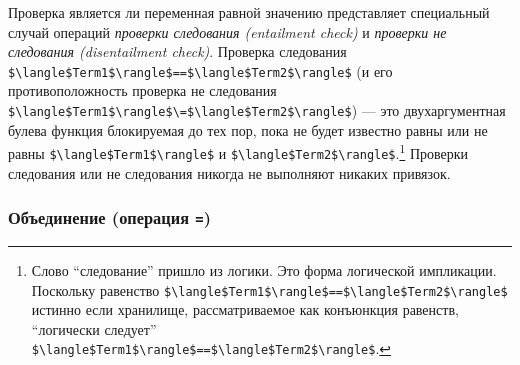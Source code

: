 Проверка является ли переменная равной значению представляет специальный случай операций \emph{проверки следования (entailment check)} и \emph{проверки не следования (disentailment check)}. Проверка следования \lstinline!$\langle$Term1$\rangle$==$\langle$Term2$\rangle$! (и его противоположность проверка не следования \lstinline!$\langle$Term1$\rangle$\=$\langle$Term2$\rangle$!) --- это двухаргументная булева функция блокируемая до тех пор, пока не будет известно равны или не равны \lstinline!$\langle$Term1$\rangle$! и \lstinline!$\langle$Term2$\rangle$!.\footnote{Слово ``следование'' пришло из логики. Это форма логической импликации. Поскольку равенство \lstinline!$\langle$Term1$\rangle$==$\langle$Term2$\rangle$! истинно если хранилище, рассматриваемое как конъюнкция равенств, ``логически следует'' \lstinline!$\langle$Term1$\rangle$==$\langle$Term2$\rangle$!.} Проверки следования или не следования никогда не выполняют никаких привязок.


\subsubsection{Объединение (операция \lstinline!=!)}


